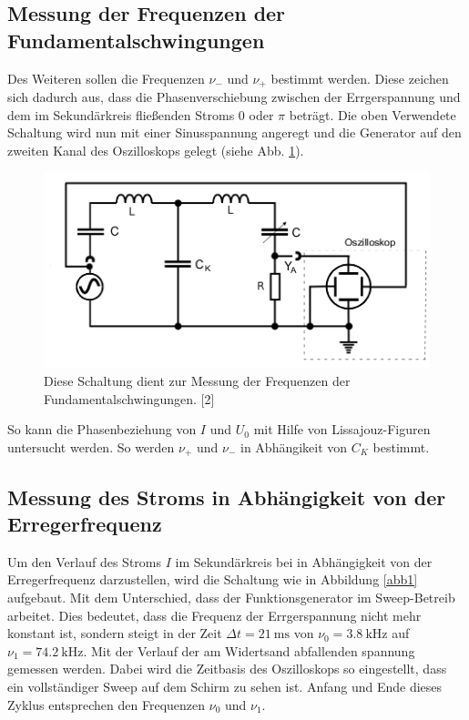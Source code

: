 \documentclass[11pt,ngerman,a4paper]{article}
\begin{document}
\subsection{Messung der Frequenzen der Fundamentalschwingungen}
Des Weiteren sollen die Frequenzen $\nu_-$ und $\nu_+$ bestimmt werden. Diese zeichen sich dadurch aus, dass die Phasenverschiebung zwischen der Errgerspannung und dem im Sekundärkreis fließenden Stroms $0$ oder $\pi$ beträgt. Die oben Verwendete Schaltung wird nun mit einer Sinusspannung angeregt und die Generator auf den zweiten Kanal des Oszilloskops gelegt (siehe Abb. \ref{abb3}).
\begin{figure}[h!]
\centering
\includegraphics[scale=0.5]{Abb/abb3.png}
\caption{Diese Schaltung dient  zur Messung der Frequenzen der Fundamentalschwingungen. [2]}
\label{abb3}
\end{figure}
 So kann die Phasenbeziehung von $I$ und $U_0$ mit Hilfe von Lissajouz-Figuren untersucht werden. So werden $\nu_+$ und $\nu_-$ in Abhängikeit von $C_K$ bestimmt.
\subsection{Messung des Stroms in Abhängigkeit von der Erregerfrequenz}
Um den Verlauf des Stroms $I$ im Sekundärkreis bei in Abhängigkeit von der Erregerfrequenz darzustellen, wird die Schaltung wie in Abbildung \ref{abb1} aufgebaut. Mit dem Unterschied, dass der Funktionsgenerator im Sweep-Betreib arbeitet. Dies bedeutet, dass die Frequenz der Errgerspannung nicht mehr konstant ist, sondern steigt in der Zeit $\Delta t =\SI{21}{\milli\second}$ von $\nu_0 = \SI{3,8}{\kilo\hertz}$ auf $\nu_1 = \SI{74,2}{\kilo\hertz}$. Mit der Verlauf der am Widertsand abfallenden spannung gemessen werden. Dabei wird die Zeitbasis des Oszilloskops so eingestellt, dass ein vollständiger Sweep auf dem Schirm zu sehen ist. Anfang und Ende dieses Zyklus entsprechen den Frequenzen $\nu_0$ und $\nu_1$.     
\end{document}
